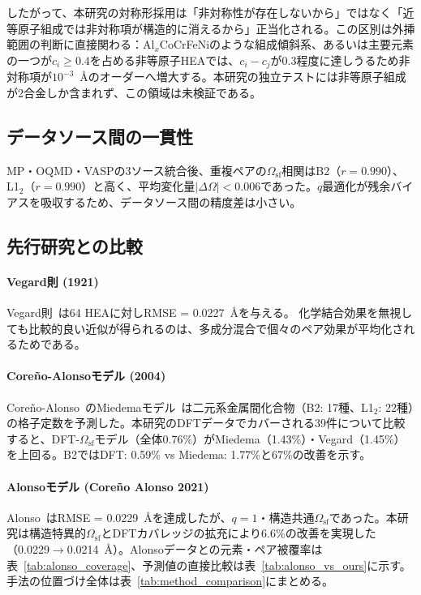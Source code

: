 \documentclass[5p,10pt]{elsarticle}
\begin{document}
したがって、本研究の対称形採用は「非対称性が存在しないから」ではなく「近等原子組成では非対称項が構造的に消えるから」正当化される。この区別は外挿範囲の判断に直接関わる：Al$_x$CoCrFeNiのような組成傾斜系、あるいは主要元素の一つが$c_i \ge 0.4$を占める非等原子HEAでは、$c_i - c_j$が0.3程度に達しうるため非対称項が$10^{-3}$~\AA{}のオーダーへ増大する。本研究の独立テストには非等原子組成が2合金しか含まれず、この領域は未検証である。

\subsection{データソース間の一貫性}

MP・OQMD・VASPの3ソース統合後、重複ペアの$\Omega_\text{sf}$相関はB2（$r = 0.990$）、L1$_2$（$r = 0.990$）と高く、平均変化量$|\Delta\Omega| < 0.006$であった。$q$最適化が残余バイアスを吸収するため、データソース間の精度差は小さい。


\subsection{先行研究との比較}

\paragraph{Vegard則 (1921)}
Vegard則~\cite{Vegard1921}は64 HEAに対しRMSE = 0.0227~\AA{}を与える。
化学結合効果を無視しても比較的良い近似が得られるのは、多成分混合で個々のペア効果が平均化されるためである。

\paragraph{Coreño-Alonsoモデル (2004)}
Coreño-Alonso~\cite{CorenoAlonso2004}のMiedemaモデル~\cite{deBoer1988}は二元系金属間化合物（B2: 17種、L1$_2$: 22種）の格子定数を予測した。本研究のDFTデータでカバーされる39件について比較すると、DFT-$\Omega_\text{sf}$モデル（全体0.76\%）がMiedema（1.43\%）・Vegard（1.45\%）を上回る。B2ではDFT: 0.59\% vs Miedema: 1.77\%と67\%の改善を示す。

\paragraph{Alonsoモデル (Coreño Alonso 2021)}
\begin{sloppypar}
Alonso~\cite{Alonso2021}はRMSE = 0.0229~\AA{}を達成したが、$q = 1$・構造共通$\Omega_\text{sf}$であった。本研究は構造特異的$\Omega_\text{sf}$とDFTカバレッジの拡充により6.6\%の改善を実現した（0.0229$\to$0.0214~\AA{}）。Alonsoデータとの元素・ペア被覆率は表~\ref{tab:alonso_coverage}、予測値の直接比較は表~\ref{tab:alonso_vs_ours}に示す。手法の位置づけ全体は表~\ref{tab:method_comparison}にまとめる。
\end{sloppypar}
\end{document}
